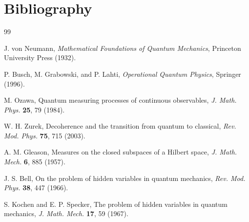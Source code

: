 \documentclass[12pt]{book}
\theoremstyle{plain}
\theoremstyle{definition}
\theoremstyle{remark}
\begin{document}
\chapter*{Bibliography}
\begin{thebibliography}{99}

J. von Neumann, \emph{Mathematical Foundations of Quantum Mechanics}, Princeton University Press (1932).

P. Busch, M. Grabowski, and P. Lahti, \emph{Operational Quantum Physics}, Springer (1996).

M. Ozawa, Quantum measuring processes of continuous observables, \emph{J. Math. Phys.} \textbf{25}, 79 (1984).

W. H. Zurek, Decoherence and the transition from quantum to classical, \emph{Rev. Mod. Phys.} \textbf{75}, 715 (2003).

A. M. Gleason, Measures on the closed subspaces of a Hilbert space, \emph{J. Math. Mech.} \textbf{6}, 885 (1957).

J. S. Bell, On the problem of hidden variables in quantum mechanics, \emph{Rev. Mod. Phys.} \textbf{38}, 447 (1966).

S. Kochen and E. P. Specker, The problem of hidden variables in quantum mechanics, \emph{J. Math. Mech.} \textbf{17}, 59 (1967).

\end{thebibliography}
\end{document}
